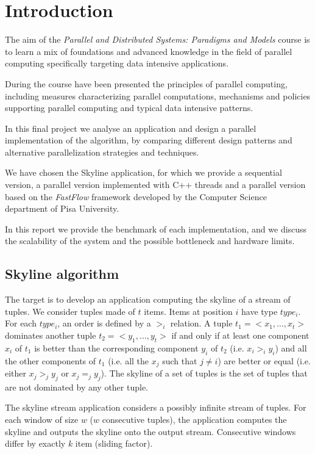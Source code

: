 \section{Introduction}
The aim of the \textit{Parallel and Distributed Systems: Paradigms and Models} course is to learn a mix of foundations and advanced knowledge in the field of parallel computing specifically targeting data intensive applications. 

During the course have been presented the principles of parallel computing, including measures characterizing parallel computations, mechanisms and policies supporting parallel computing and typical data intensive patterns.

In this final project we analyse an application and design a parallel implementation of the algorithm, by comparing different design patterns and alternative parallelization strategies and techniques.

We have chosen the Skyline application, for which we provide a sequential version, a parallel version implemented with C++ threads and a parallel version based on the \textit{FastFlow} framework developed by the Computer Science department of Pisa University.

In this report we provide the benchmark of each implementation, and we discuss the scalability of the system and the possible bottleneck and hardware limits.

\subsection{Skyline algorithm}
The target is to develop an application computing the skyline of a stream of tuples. We consider tuples
made of $t$ items. Items at position $i$ have type $type_i$. For each $type_i$, an order is defined by a $>_i$ relation. A tuple $t_1 = <x_1, ... , x_t>$ dominates another tuple $t_2 = <y_1, ... , y_t>$ if and only if at least one component $x_i$ of $t_1$ is better than the corresponding component $y_i$ of $t_2$ (i.e. $x_i >_i y_i$) and all the other components of $t_1$ (i.e. all the $x_j$ such that $j \neq i$) are better or equal (i.e. either $x_j >_j y_j$ or $x_j =_j y_j$). The skyline of a set of tuples is the set of tuples that are not dominated by any other tuple.

The skyline stream application considers a possibly infinite stream of tuples. For each window of size $w$ ($w$ consecutive tuples), the application computes the skyline and outputs the skyline onto the output stream. Consecutive windows differ by exactly $k$ item (sliding factor).

